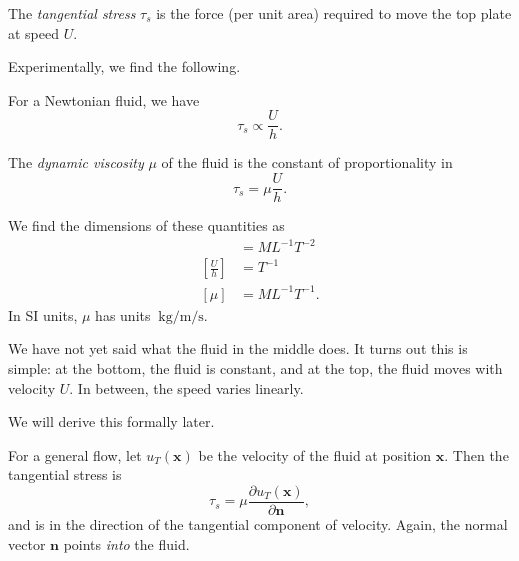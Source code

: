 \documentclass[a4paper]{article}
\begin{document}
\begin{defi}
  The \emph{tangential stress} $\tau_s$ is the force (per unit area) required to move the top plate at speed $U$.
\end{defi}

Experimentally, we find the following.
\begin{law}
  For a Newtonian fluid, we have
  \[
    \tau_s \propto \frac{U}{h}.
  \]
\end{law}

\begin{defi}
  The \emph{dynamic viscosity} $\mu$ of the fluid is the constant of proportionality in
  \[
    \tau_s = \mu \frac{U}{h}.
  \]
\end{defi}

We find the dimensions of these quantities as
\begin{align*}
  [\tau_s] &= ML^{-1} T^{-2}\\
  \left[\frac{U}{h}\right] &= T^{-1}\\
  [\mu] &= ML^{-1} T^{-1}.
\end{align*}
In SI units, $\mu$ has units $\SI{}{\kilo\gram\per\meter\per\second}$.

We have not yet said what the fluid in the middle does. It turns out this is simple: at the bottom, the fluid is constant, and at the top, the fluid moves with velocity $U$. In between, the speed varies linearly.
\begin{center} %
\end{center}
We will derive this formally later.

For a general flow, let $u_T(\mathbf{x})$ be the velocity of the fluid at position $\mathbf{x}$. Then the tangential stress is
\[
  \tau_s = \mu \frac{\partial u_T(\mathbf{x})}{\partial \mathbf{n}},
\]
and is in the direction of the tangential component of velocity. Again, the normal vector $\mathbf{n}$ points \emph{into} the fluid.
\end{document}
